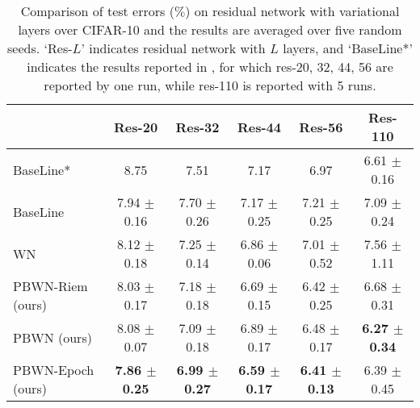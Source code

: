 \documentclass[twocolumn]{article}
\begin{document}
\begin{table*}[t]
\caption{Comparison of test errors ($\%$) on residual network with variational layers over CIFAR-10 and the results are averaged over five random seeds. `Res-$L$' indicates residual network with $L$ layers, and `BaseLine*' indicates the results reported in \cite{2015_CVPR_He}, for which res-20, 32, 44, 56 are reported by one run, while res-110 is reported with 5 runs.}
\label{table:resnet1}
\vskip 0.0in
\begin{center}
\begin{small}
\begin{tabular}{l|ccccc}
\toprule
     & Res-20 & Res-32 & Res-44 & Res-56 & Res-110 \\
\hline
BaseLine*  &  8.75 &7.51 &7.17 & 6.97& 6.61 $\pm$ 0.16\\
BaseLine  &  7.94 $\pm$ 0.16 &7.70  $\pm$ 0.26  &7.17 $\pm$ 0.25 & 7.21 $\pm$ 0.25  & 7.09 $\pm$ 0.24\\
WN  &  8.12 $\pm$ 0.18 &7.25  $\pm$ 0.14  &6.86 $\pm$ 0.06 & 7.01 $\pm$ 0.52  & 7.56 $\pm$ 1.11\\
PBWN-Riem (ours) &  8.03 $\pm$ 0.17 &7.18  $\pm$ 0.18  &6.69 $\pm$ 0.15 & 6.42 $\pm$ 0.25  & 6.68 $\pm$ 0.31\\
PBWN (ours) &  8.08 $\pm$ 0.07 &7.09  $\pm$ 0.18  &6.89 $\pm$ 0.17 & 6.48 $\pm$ 0.17  & \textbf{6.27 $\pm$ 0.34}\\
PBWN-Epoch (ours) &  \textbf{7.86 $\pm$ 0.25}  &\textbf{6.99 $\pm$ 0.27 } &\textbf{6.59 $\pm$ 0.17}   & \textbf{6.41 $\pm$ 0.13}    & 6.39 $\pm$ 0.45\\
\bottomrule
\end{tabular}
\end{small}
\end{center}
\vskip -0.15in
\end{table*}
\end{document}
